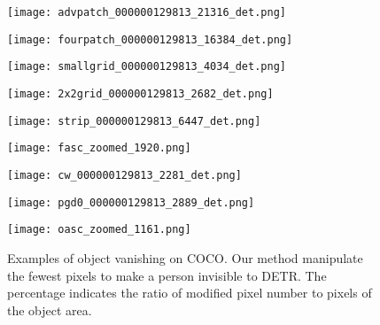 \documentclass[times,twocolumn,final,authoryear]{elsarticle}
\begin{document}
\begin{figure}[!t]
\centering
\begin{minipage}[]{.320\linewidth}
\footnotesize \centering
\texttt{[image: advpatch\_000000129813\_21316\_det.png]}
\end{minipage}
\hspace{0in}
\begin{minipage}[]{.320\linewidth}
\footnotesize \centering
\texttt{[image: fourpatch\_000000129813\_16384\_det.png]}
\end{minipage}
\hspace{0in}
\begin{minipage}[]{.320\linewidth}
\footnotesize \centering
\texttt{[image: smallgrid\_000000129813\_4034\_det.png]}
\end{minipage}
\begin{minipage}[]{.320\linewidth}
\footnotesize \centering
\texttt{[image: 2x2grid\_000000129813\_2682\_det.png]}
\end{minipage}
\hspace{0in}
\begin{minipage}[]{.320\linewidth}
\footnotesize \centering
\texttt{[image: strip\_000000129813\_6447\_det.png]}
\end{minipage}
\hspace{0in}
\begin{minipage}[]{.320\linewidth}
\footnotesize \centering
\texttt{[image: fasc\_zoomed\_1920.png]}
\end{minipage}
\begin{minipage}[]{.320\linewidth}
\footnotesize \centering
\texttt{[image: cw\_000000129813\_2281\_det.png]}
\end{minipage}
\hspace{0in}
\begin{minipage}[]{.320\linewidth}
\footnotesize \centering
\texttt{[image: pgd0\_000000129813\_2889\_det.png]}
\end{minipage}
\hspace{0in}
\begin{minipage}[]{.320\linewidth}
\footnotesize \centering
\texttt{[image: oasc\_zoomed\_1161.png]}
\end{minipage}
\caption{Examples of object vanishing on COCO. Our method manipulate the fewest pixels to make a person invisible to DETR. The percentage indicates the ratio of modified pixel number to pixels of the object area.}
\label{fig:cloaking}
\end{figure}
\end{document}
